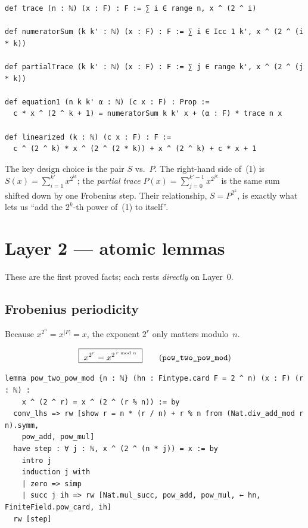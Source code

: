 \documentclass[11pt]{article}
\newcommand{\lc}[1]{\texttt{#1}}
\begin{document}
\begin{lstlisting}
def trace (n : ℕ) (x : F) : F := ∑ i ∈ range n, x ^ (2 ^ i)

def numeratorSum (k k' : ℕ) (x : F) : F := ∑ i ∈ Icc 1 k', x ^ (2 ^ (i * k))

def partialTrace (k k' : ℕ) (x : F) : F := ∑ j ∈ range k', x ^ (2 ^ (j * k))

def equation1 (n k k' α : ℕ) (c x : F) : Prop :=
  c * x ^ (2 ^ k + 1) = numeratorSum k k' x + (α : F) * trace n x

def linearized (k : ℕ) (c x : F) : F :=
  c ^ (2 ^ k) * x ^ (2 ^ (2 * k)) + x ^ (2 ^ k) + c * x + 1
\end{lstlisting}

The key design choice is the pair $S$ vs.\ $P$.  The right-hand side of~(1) is
$S(x)=\sum_{i=1}^{k'}x^{2^{ik}}$; the \emph{partial trace}
$P(x)=\sum_{j=0}^{k'-1}x^{2^{jk}}$ is the same sum shifted down by one Frobenius
step.  Their relationship, $S=P^{2^k}$, is exactly what lets us ``add the
$2^k$-th power of~(1) to itself''.

\section{Layer 2 --- atomic lemmas}
These are the first proved facts; each rests \emph{directly} on Layer~0.

\subsection{Frobenius periodicity}
\label{sec:frob}
Because $x^{2^n}=x^{|F|}=x$, the exponent $2^r$ only matters modulo~$n$.

\[
  \boxed{\;x^{2^r}=x^{2^{\,r\bmod n}}\;}
  \qquad\text{(\lc{pow\_two\_pow\_mod})}
\]

\begin{lstlisting}
lemma pow_two_pow_mod {n : ℕ} (hn : Fintype.card F = 2 ^ n) (x : F) (r : ℕ) :
    x ^ (2 ^ r) = x ^ (2 ^ (r % n)) := by
  conv_lhs => rw [show r = n * (r / n) + r % n from (Nat.div_add_mod r n).symm,
    pow_add, pow_mul]
  have step : ∀ j : ℕ, x ^ (2 ^ (n * j)) = x := by
    intro j
    induction j with
    | zero => simp
    | succ j ih => rw [Nat.mul_succ, pow_add, pow_mul, ← hn, FiniteField.pow_card, ih]
  rw [step]
\end{lstlisting}
\end{document}
